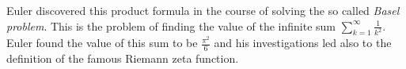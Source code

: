 






\medskip
Euler discovered this product formula in the course of solving the so called \emph{Basel problem}. This is the problem of finding the value of the infinite sum $\sum_{k=1}^{\infty} \frac{1}{k^2}$. Euler found the value of this sum to be $\frac{\pi^2}{6}$ and his investigations led also to the definition of the famous Riemann zeta function. 

